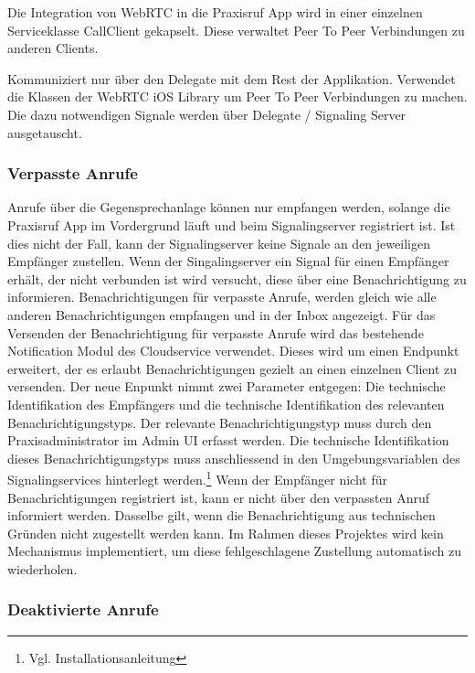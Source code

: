 Die Integration von WebRTC in die Praxisruf App wird in einer einzelnen Serviceklasse CallClient gekapselt.
Diese verwaltet Peer To Peer Verbindungen zu anderen Clients.

Kommuniziert nur über den Delegate mit dem Rest der Applikation.
Verwendet die Klassen der WebRTC iOS Library um Peer To Peer Verbindungen zu machen.
Die dazu notwendigen Signale werden über Delegate / Signaling Server ausgetauscht.

\clearpage

\subsubsection{Verpasste Anrufe}

Anrufe über die Gegensprechanlage können nur empfangen werden, solange die Praxisruf App im Vordergrund läuft und beim Signalingserver registriert ist.
Ist dies nicht der Fall, kann der Signalingserver keine Signale an den jeweiligen Empfänger zustellen.
Wenn der Singalingserver ein Signal für einen Empfänger erhält, der nicht verbunden ist wird versucht, diese über eine Benachrichtigung zu informieren.
Benachrichtigungen für verpasste Anrufe, werden gleich wie alle anderen Benachrichtigungen empfangen und in der Inbox angezeigt.
Für das Versenden der Benachrichtigung für verpasste Anrufe wird das bestehende Notification Modul des Cloudservice verwendet.
Dieses wird um einen Endpunkt erweitert, der es erlaubt Benachrichtigungen gezielt an einen einzelnen Client zu versenden.
Der neue Enpunkt nimmt zwei Parameter entgegen:
Die technische Identifikation des Empfängers und die technische Identifikation des relevanten Benachrichtigungstyps.
Der relevante Benachrichtigungstyp muss durch den Praxisadministrator im Admin UI erfasst werden.
Die technische Identifikation dieses Benachrichtigungstyps muss anschliessend in den Umgebungsvariablen des Signalingservices hinterlegt werden.\footnote{Vgl. Installationsanleitung}
Wenn der Empfänger nicht für Benachrichtigungen registriert ist, kann er nicht über den verpassten Anruf informiert werden.
Dasselbe gilt, wenn die Benachrichtigung aus technischen Gründen nicht zugestellt werden kann.
Im Rahmen dieses Projektes wird kein Mechanismus implementiert, um diese fehlgeschlagene Zustellung automatisch zu wiederholen.

\subsubsection{Deaktivierte Anrufe}

